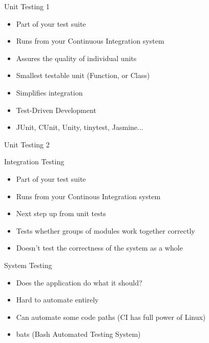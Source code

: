 \documentclass{beamer}
\begin{document}
\begin{frame}{Unit Testing 1}
	\begin{itemize}
		\item Part of your test suite
		\item Runs from your Continuous Integration system
		\item Assures the quality of individual units
		\item Smallest testable unit (Function, or Class)
		\item Simplifies integration
		\item Test-Driven Development
		\item JUnit, CUnit, Unity, tinytest, Jasmine...
	\end{itemize}
\end{frame}


\begin{frame}{Unit Testing 2}
	\lstI
\end{frame}

\begin{frame}{Integration Testing}
	\begin{itemize}
		\item Part of your test suite
		\item Runs from your Continous Integration system
		\item Next step up from unit tests
		\item Tests whether groups of modules work together correctly
		\item Doesn't test the correctness of the system as a whole
	\end{itemize}
\end{frame}

\begin{frame}{System Testing}
	\begin{itemize}
		\item Does the application do what it should?
		\item Hard to automate entirely
		\item Can automate some code paths (CI has full power of Linux)
		\item bats (Bash Automated Testing System)
	\end{itemize}
\end{frame}
\end{document}
